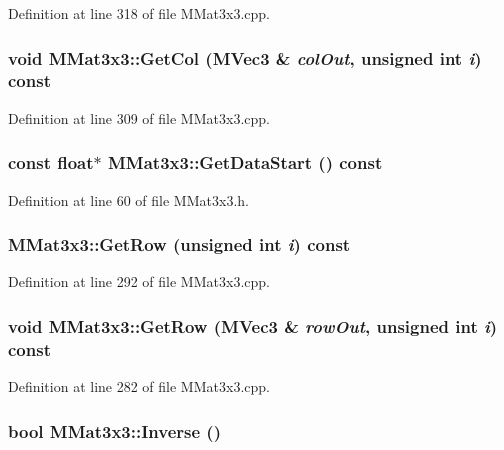 Definition at line 318 of file MMat3x3.cpp.\hypertarget{class_m_mat3x3_287d293d9d309a9991ffb4cae6652998}{
\subsubsection[{GetCol}]{\setlength{\rightskip}{0pt plus 5cm}void MMat3x3::GetCol ({\bf MVec3} \& {\em colOut}, \/  unsigned int {\em i}) const}}
\label{class_m_mat3x3_287d293d9d309a9991ffb4cae6652998}




Definition at line 309 of file MMat3x3.cpp.\hypertarget{class_m_mat3x3_604ffd6c5ec41b1912146e692074bab0}{
\subsubsection[{GetDataStart}]{\setlength{\rightskip}{0pt plus 5cm}const float$\ast$ MMat3x3::GetDataStart () const}}
\label{class_m_mat3x3_604ffd6c5ec41b1912146e692074bab0}




Definition at line 60 of file MMat3x3.h.\hypertarget{class_m_mat3x3_31977832772ce75b2ad0d494e6bbcd30}{
\subsubsection[{GetRow}]{ MMat3x3::GetRow (unsigned int {\em i}) const}}
\label{class_m_mat3x3_31977832772ce75b2ad0d494e6bbcd30}




Definition at line 292 of file MMat3x3.cpp.\hypertarget{class_m_mat3x3_a4ca3211b668abaa0ce6cefb4792dd1f}{
\subsubsection[{GetRow}]{\setlength{\rightskip}{0pt plus 5cm}void MMat3x3::GetRow ({\bf MVec3} \& {\em rowOut}, \/  unsigned int {\em i}) const}}
\label{class_m_mat3x3_a4ca3211b668abaa0ce6cefb4792dd1f}




Definition at line 282 of file MMat3x3.cpp.\hypertarget{class_m_mat3x3_b4b44fc1b81ea6b43cc272ed9433e584}{
\subsubsection[{Inverse}]{\setlength{\rightskip}{0pt plus 5cm}bool MMat3x3::Inverse ()}}
\label{class_m_mat3x3_b4b44fc1b81ea6b43cc272ed9433e584}




